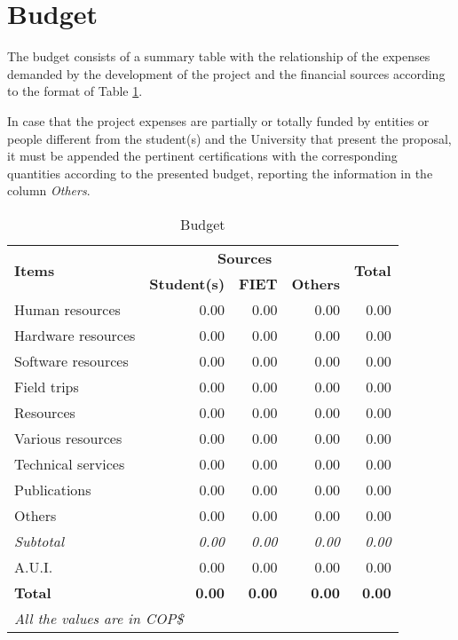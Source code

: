 \section{Budget}
\label{sec:budget}

The budget consists of a summary table with the relationship of the expenses demanded by the development of the project and the financial sources according to the format of Table \ref{tab:budget}.

In case that the project expenses are partially or totally funded by entities or people different from the student(s) and the University that present the proposal, it must be appended the pertinent certifications with the corresponding quantities according to the presented budget, reporting the information in the column \emph{Others}.

\begin{table}[!ht]
    \centering
    \scriptsize
    \begin{tabular}{|l|r|r|r|r|}
        
        \hline
        \multirow{2}{0.2\textwidth}{\centering\textbf{Items}} & \multicolumn{3}{|c|}{\textbf{Sources}} &  \multirow{2}{0.1\textwidth}{\centering\textbf{Total}} \\
        \cline{2-4}
        & \multicolumn{1}{|c|}{\textbf{Student(s)}} & \multicolumn{1}{|c|}{\textbf{FIET}} & \multicolumn{1}{|c|}{\textbf{Others}} & \\
        \hline
        
        \hline
        Human resources & 0.00 & 0.00 & 0.00 & 0.00 \\
        \hline
        Hardware resources & 0.00 & 0.00 & 0.00 & 0.00 \\
        \hline
        Software resources & 0.00 & 0.00 & 0.00 & 0.00 \\
        \hline
        Field trips & 0.00 & 0.00 & 0.00 & 0.00 \\
        \hline
        Resources & 0.00 & 0.00 & 0.00 & 0.00 \\
        \hline
        Various resources & 0.00 & 0.00 & 0.00 & 0.00 \\
        \hline
        Technical services & 0.00 & 0.00 & 0.00 & 0.00 \\
        \hline
        Publications & 0.00 & 0.00 & 0.00 & 0.00 \\
        \hline
        Others & 0.00 & 0.00 & 0.00 & 0.00 \\
        \hline
        \textit{Subtotal} & \textit{0.00} & \textit{0.00} & \textit{0.00} & \textit{0.00} \\
        \hline
        A.U.I. & 0.00 & 0.00 & 0.00 & 0.00 \\
        \hline
        \textbf{Total} & \textbf{0.00} & \textbf{0.00} & \textbf{0.00} & \textbf{0.00} \\
        \hline
        
        \multicolumn{4}{l}{\tiny{\textit{All the values are in COP\$}}}
        
    \end{tabular}
    \caption{Budget}
    \label{tab:budget}
\end{table}

